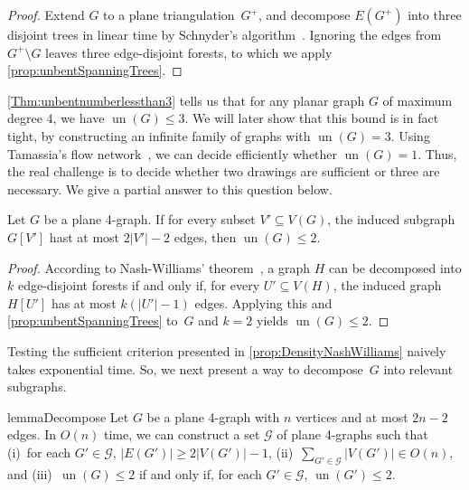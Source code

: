\documentclass[runningheads]{llncs}
\newcommand{\restateref}[1]{\IfAppendix{\hyperref[#1]{$\star$}}{\hyperref[#1*]{$\star$}}}
\newcommand{\un}{\operatorname{un}}
\begin{document}
\begin{proof}
    Extend $G$ to a plane triangulation~$G^+$, and decompose $E(G^+)$ into three disjoint trees in linear time by Schnyder's algorithm~\cite{DBLP:conf/soda/Schnyder90}.
    Ignoring the edges from $G^+ \setminus G$ leaves three edge-disjoint forests,
    to which we apply \cref{prop:unbentSpanningTrees}.
\end{proof}

\cref{Thm:unbentnumberlessthan3} tells us that for any planar graph $G$ of maximum degree $4$, we have $\un(G)\le3$.
We will later show that this bound is in fact tight, by constructing an infinite family of graphs with $\un(G)=3$.
Using Tamassia's flow network~\cite{t-oeggwmnb-sjc}, we can decide efficiently whether $\un(G)=1$.
Thus, the real challenge is to decide whether two drawings are sufficient or three are necessary.
We give a partial answer to this question below.

\begin{proposition}
    \label{prop:DensityNashWilliams}
    Let $G$ be a plane 4-graph.
    If for every subset $V' \subseteq V(G)$,
    the induced subgraph $G[V']$ hast at most $2|V'| -2$ edges,
    then $\un(G) \leq 2$.
\end{proposition}
\begin{proof}
    According to Nash-Williams' theorem~\cite{n-edstfg-JLMS61},
    a graph $H$ can be decomposed into $k$ edge-disjoint forests
    if and only if, for every $U' \subseteq V(H)$, the induced graph
    $H[U']$ has at most $k(|U'| - 1)$ edges.
    Applying this and \cref{prop:unbentSpanningTrees} to~$G$ and $k = 2$
    yields $\un(G) \leq 2$.
\end{proof}



Testing the sufficient criterion presented in \cref{prop:DensityNashWilliams}
naively takes exponential time.
So, we next present a way to decompose~$G$ into %
relevant subgraphs.

\begin{restatable}[\restateref{lm:decompose}]{lemma}{Decompose}
    \label{lm:decompose}
    Let $G$ be a plane 4-graph with $n$ vertices and at most $2n - 2$ edges.
    In $O(n)$ time,
    we can construct a set $\mathcal{G}$ of plane 4-graphs such that
    (i)~for each $G' \in \mathcal{G}$, $|E(G')| \ge 2 |V(G')| - 1$,
    (ii)~$\sum_{G' \in \mathcal{G}} |V(G')| \in O(n)$, and
    (iii)~$\un(G) \le 2$ if and only if, for each $G' \in \mathcal{G}$, $\un(G') \le 2$.
\end{restatable}
\end{document}
